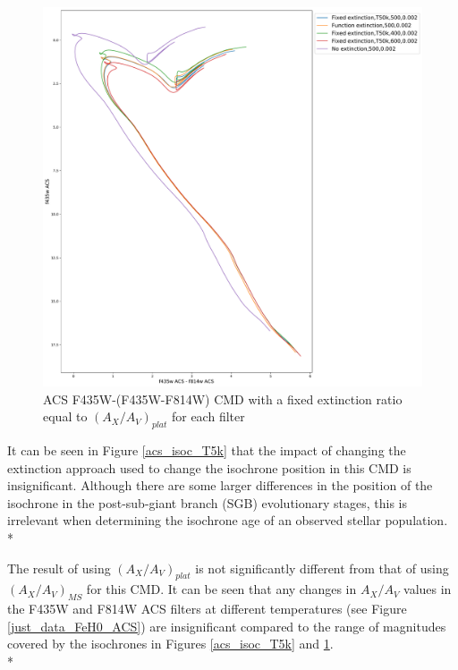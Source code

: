\documentclass[12pt, a4paper]{report}
\begin{document}
\begin{figure}[h]
\begin{center}
\includegraphics[width=1.0\textwidth]{../basti_isochrones_10_13Gyr/Extinction_T50k_FeH0fix_func_f435wACS_f435wACSmf814wACS_500_400_600_Myr_FeH_0p002_ref_noext_Av_1p0.pdf}
\caption{ACS F435W-(F435W-F814W) CMD with a fixed extinction ratio equal to $(A_{X}/A_{V})_{plat}$ for each filter}
\label{acs_isoc_T50k}
\end{center}
\end{figure}

It can be seen in Figure \ref{acs_isoc_T5k} that the impact of changing the extinction approach used to change the isochrone position in this CMD is insignificant. Although there are some larger differences in the position of the isochrone in the post-sub-giant branch (SGB) evolutionary stages, this is irrelevant when determining the isochrone age of an observed stellar population.\\*

The result of using $(A_{X}/A_{V})_{plat}$ is not significantly different from that of using $(A_{X}/A_{V})_{MS}$ for this CMD. It can be seen that any changes in $A_{X}/A_{V}$ values in the F435W and F814W ACS filters at different temperatures (see Figure \ref{just_data_FeH0_ACS}) are insignificant compared to the range of magnitudes covered by the isochrones in Figures \ref{acs_isoc_T5k} and \ref{acs_isoc_T50k}.\\*
\end{document}
